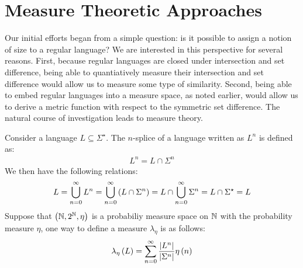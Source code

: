 
\section{Measure Theoretic Approaches}

Our initial efforts began from a simple question:
is it possible to assign a notion of size to a regular language?
We are interested in this perspective for several reasons.
First, because regular languages are closed under
intersection and set difference,
being able to quantiatively measure their intersection and set
difference would allow us to measure some type of similarity.
Second, being able to embed regular languages into a measure space,
as noted earlier,
would allow us to derive a metric function with respect to the
symmetric set difference.
The natural course of investigation leads to measure theory.

Consider a language \(L \subseteq \Sigma^\star\).
The \(n\)-splice of a language written as \(L^n\) is defined as:
\begin{align*}
  L^n = L \cap \Sigma^n
\end{align*}
We then have the following relations:
\begin{align*}
  L
    = \bigcup_{n = 0}^{\infty} L^n
    = \bigcup_{n = 0}^{\infty} \left(L \cap \Sigma^n\right)
    = L \cap \bigcup_{n = 0}^{\infty} \Sigma^n
    = L \cap \Sigma^\star
    = L
\end{align*}
Suppose that \(\left(\mathbb{N}, 2^{\mathbb{N}}, \eta\right)\) is a probabiliy measure space
on \(\mathbb{N}\) with the probability measure \(\eta\),
one way to define a measure \(\lambda_{\eta}\)
is as follows:
\begin{align*}
  \lambda_{\eta} \left(L\right)
    = \sum_{n = 0}^{\infty}
        \frac{\left\lvert L^n\right\rvert}{\left\lvert\Sigma^n\right\rvert} \eta\left(n\right)
\end{align*}

